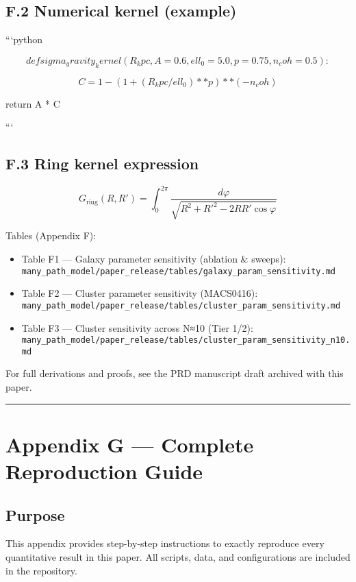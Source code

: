 \documentclass[11pt,a4paper]{article}
\begin{document}
\subsection{F.2 Numerical kernel (example)}


```python

\[
def sigma_gravity_kernel(R_kpc, A=0.6, ell_0=5.0, p=0.75, n_coh=0.5):
\]

\[
C = 1 - (1 + (R_kpc/ell_0)**p)**(-n_coh)
\]

    return A * C

```


\subsection{F.3 Ring kernel expression}


\begin{equation}
G_{\mathrm{ring}}(R, R') = \int_{0}^{2\pi} \frac{d\varphi}{\sqrt{R^2 + R'^2 - 2 R R'\cos\varphi}}
\end{equation}


Tables (Appendix F):

\begin{itemize}
\item Table F1 — Galaxy parameter sensitivity (ablation \& sweeps): \texttt{many\_path\_model/paper\_release/tables/galaxy\_param\_sensitivity.md}
\item Table F2 — Cluster parameter sensitivity (MACS0416): \texttt{many\_path\_model/paper\_release/tables/cluster\_param\_sensitivity.md}
\item Table F3 — Cluster sensitivity across N≈10 (Tier 1/2): \texttt{many\_path\_model/paper\_release/tables/cluster\_param\_sensitivity\_n10.md}
\end{itemize}


For full derivations and proofs, see the PRD manuscript draft archived with this paper.


\medskip\hrule\medskip


\section{Appendix G — Complete Reproduction Guide}


\subsection{Purpose}


This appendix provides step-by-step instructions to exactly reproduce every quantitative result in this paper. All scripts, data, and configurations are included in the repository.
\end{document}
